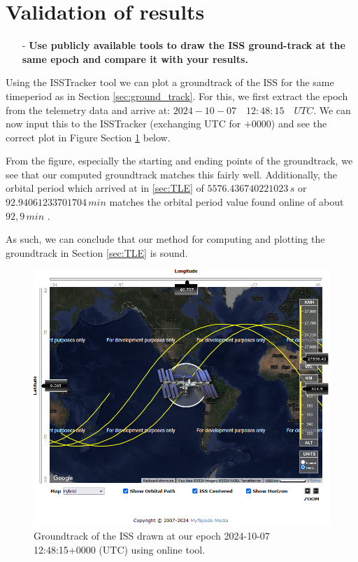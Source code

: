 \section{Validation of results}
\label{sec:validation}

\begin{itemize}
    \item[-] \textbf{Use publicly available tools to draw the ISS ground-track at the same epoch and compare it with your results.}
\end{itemize}

Using the ISSTracker tool we can plot a groundtrack of the ISS for the same timeperiod as in Section \ref{sec:ground_track}. 
For this, we first extract the epoch from the telemetry data and arrive at: $2024-10-07 \quad 12:48:15 \quad UTC$.
We can now input this to the ISSTracker (exchanging UTC for $+0000$) and see the correct plot in Figure Section \ref{fig:ISS_validation} below.

From the figure, especially the starting and ending points of the groundtrack, we see that our computed groundtrack matches this fairly well.
Additionally, the orbital period which arrived at in \ref{sec:TLE} of $5576.436740221023 \, s$ or $92.94061233701704 \, min$ matches the orbital period value found online of about $92,9 \, min$ \cite{ISS_tracking_orbitalperiod}.

As such, we can conclude that our method for computing and plotting the groundtrack in Section \ref{sec:TLE} is sound.

\begin{figure}[H]
    \centering
    \includegraphics[width=0.8\linewidth]{Graphics/ISS_validation.png}
    \caption{Groundtrack of the ISS drawn at our epoch 2024-10-07 12:48:15+0000 (UTC) using online tool. \cite{ISStracker}}
    \label{fig:ISS_validation}
\end{figure}


